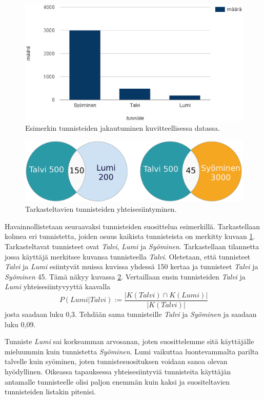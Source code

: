 \documentclass[12pt,finnish]{tktltiki2}
\theoremstyle{definition}
\theoremstyle{remark}
\begin{document}
\begin{figure}[]
\includegraphics[width = 390pt]{tunnisteet.eps}\caption{Esimerkin tunnisteiden jakautuminen kuvitteellisessa datassa.}
\label{esimerkkitunnisteet}
\end{figure}
\begin{figure}[]
\includegraphics[width = 400pt]{vennit.eps}\caption{Tarkasteltavien tunnisteiden yhteisesiintyminen.}
\label{vennit}
\end{figure}
Havainnollistetaan seuraavaksi tunnisteiden suosittelua esimerkillä. Tarkastellaan kolmea eri tunnistetta, joiden osuus kaikista tunnisteista on merkitty kuvaan \ref{esimerkkitunnisteet}. Tarkasteltavat tunnisteet ovat \textit{Talvi}, \textit{Lumi} ja \textit{Syöminen}. Tarkastellaan tilannetta jossa käyttäjä merkitsee kuvansa tunnisteella \textit{Talvi}. Oletetaan, että tunnisteet \textit{Talvi} ja \textit{Lumi} esiintyvät muissa kuvissa yhdessä 150 kertaa ja tunnisteet \textit{Talvi} ja \textit{Syöminen} 45. Tämä näkyy kuvassa \ref{vennit}. Vertaillaan ensin tunnisteiden \textit{Talvi} ja \textit{Lumi} yhteisesiintyvyyttä kaavalla 
\begin{displaymath} 
P (Lumi | Talvi):= \frac{|K(Talvi) \cap K(Lumi)|} {|K(Talvi)|}
\end{displaymath}
josta saadaan luku 0,3.
Tehdään sama tunnisteille \textit{Talvi} ja \textit{Syöminen} ja saadaan luku 0,09. 

Tunniste \textit{Lumi} sai korkeamman arvosanan, joten suosittelemme sitä käyttäjälle mieluummin kuin tunnistetta \textit{Syöminen}. Lumi vaikuttaa luontevammalta parilta talvelle kuin syöminen, joten tunnistesuosituksen voidaan sanoa olevan hyödyllinen. Oikeassa tapauksessa yhteisesiintyviä tunnisteita käyttäjän antamalle tunnisteelle olisi paljon enemmän kuin kaksi ja suositeltavien tunnisteiden listakin pitenisi.
\end{document}

